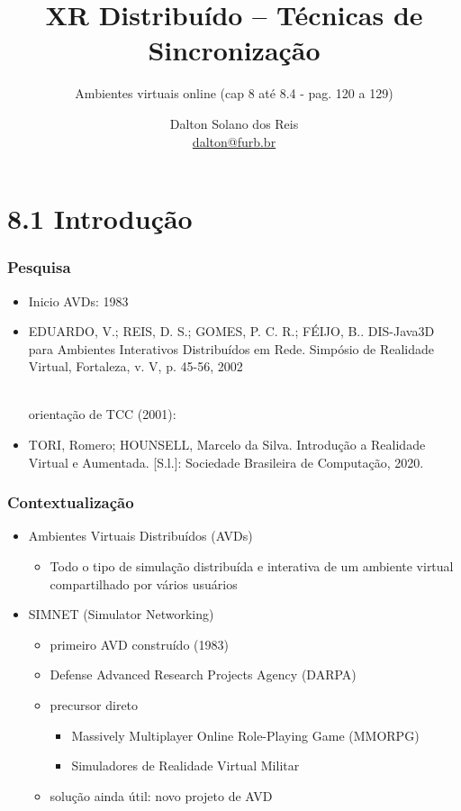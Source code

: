 \documentclass{beamer}
\title[XR Distribuído – Técnicas de Sincronização]{XR Distribuído – Técnicas de Sincronização}
\subtitle{Ambientes virtuais online (cap 8 até 8.4 - pag. 120 a 129)}
\author[Dalton Solano dos Reis]{
  Dalton Solano dos Reis\texorpdfstring{\\\medskip}{}%
  {\small \href{mailto:dalton@furb.br}{dalton@furb.br}}}
\institute[UDESC]{
  Centro de Ciências e Tecnológicas\\
  Universidade do Estado de Santa Catarina}
\begin{document}
\begin{frame}
  \titlepage

\end{frame}

\section{8.1 Introdução}

\begin{frame}
  \frametitle{Pesquisa}
  \begin{itemize}
    \item Inicio AVDs: 1983
    \item EDUARDO, V.; REIS, D. S.; GOMES, P. C. R.; FÉIJO, B.. DIS-Java3D para Ambientes Interativos Distribuídos em Rede. Simpósio de Realidade Virtual, Fortaleza, v. V, p. 45-56, 2002
    \begin{flushright}
      \scriptsize
      \cite{Eduardo2002} \\
      orientação de TCC (2001): \cite{Eduardo2001} 
    \end{flushright}
    \item TORI, Romero; HOUNSELL, Marcelo da Silva. Introdução a Realidade Virtual e Aumentada. [S.l.]: Sociedade Brasileira de Computação, 2020. 
    \begin{flushright}
      \scriptsize
      \cite{toriIntroducaoRealidadeVirtual2020}
    \end{flushright}
  \end{itemize}
\end{frame}

\begin{frame}
  \frametitle{Contextualização}
    \begin{itemize}
      \item Ambientes Virtuais Distribuídos (AVDs)
      \begin{itemize}
        \item Todo o tipo de simulação distribuída e interativa de um ambiente virtual compartilhado por vários usuários
      \end{itemize}
      \item SIMNET (Simulator Networking)
      \begin{itemize}
        \item primeiro AVD construído (1983)
        \item Defense Advanced Research Projects Agency (DARPA)
        \item precursor direto
        \begin{itemize}
          \item Massively Multiplayer Online Role-Playing Game (MMORPG)
          \item Simuladores de Realidade Virtual Militar
        \end{itemize}
        \item solução ainda útil: novo projeto de AVD
      \end{itemize} 
    \end{itemize}
\end{frame}
\end{document}
